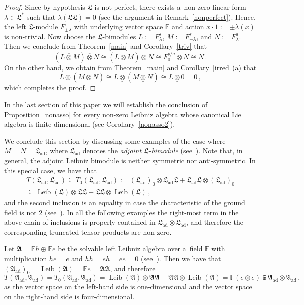 \documentclass{jonasart}
\DeclareMathOperator{\ad}{ad}
\DeclareMathOperator{\leib}{Leib}
\newcommand{\af}{\mathfrak{A}}
\newcommand{\fbb}{\mathbb{F}}
\newcommand{\lf}{\mathfrak{L}}
\newcommand{\ovo}{\overline{\otimes}}
\newcommand{\und}{\underline{\otimes}}
\begin{document}
	\begin{proof}
		Since by hypothesis $\lf$ is not perfect, there exists a~non-zero linear form $\lambda\in\lf^*$ such that $\lambda(\lf\lf)=0$
		(see the argument in Remark~\ref{nonperfect}). Hence, the left
		$\lf$-module $F_{\pm \lambda}$ with underlying vector space
		$\fbb$ and action $x\cdot 1:=\pm\lambda(x)$ is non-trivial. Now choose the $\lf$-bimodules $L:=F_\lambda^s$, $M:=
		F_{-\lambda}^s$, and $N:=F_\lambda^a$. Then we conclude from Theorem~\ref{main} and Corollary~\ref{triv} that
		\[
			(L\ovo M)\ovo N\cong(L\und M)\und N\cong F_0^{s/a}
			\otimes N\cong N\,.
		\]
		On the other hand, we obtain from Theorem~\ref{main} and
		Corollary~\ref{irred}\,(a)
		that
		\[
			L\ovo(M\ovo N)\cong L\und(M\und N)\cong L\und 0=0\,,
		\]
		which completes the proof.
	\end{proof}

	In the last section of this paper we will establish the conclusion of Proposition~\ref{nonasso} for every non-zero Leibniz algebra whose canonical Lie algebra is finite dimensional (see
	Corollary~\ref{nonasso2}).

	We conclude this section by discussing some examples of the case where $M=N=\lf_{\ad}$, where $\lf_{\ad}$ denotes the
	\emph{adjoint $\lf$-bimodule\/} (see~\cite[Example 3.8]{F1}). Note that, in general, the adjoint Leibniz bimodule is neither symmetric nor anti-sym\-metric. In this special case, we have that
	\begin{eqnarray*}
		T(\lf_{\ad},\lf_{\ad})\subseteq T_0 (\lf_{\ad},\lf_{\ad}):=
		(\lf_{\ad})_0\otimes\lf_{\ad}\lf+\lf_{\ad}\lf\otimes(\lf_{\ad})_0\\
		\subseteq\leib(\lf)\otimes\lf\lf+\lf\lf\otimes\leib(\lf)\,,
	\end{eqnarray*}
	and the second inclusion is an equality in case the characteristic of the ground field is not 2 (see~\cite[Example 3.11]{F1}). In all the following examples the right-most term in the above chain of inclusions is properly contained in $\lf_{\ad}\otimes\lf_{\ad}$, and therefore the corresponding truncated tensor products are non-zero.
	\begin{example}
		{Let $\af=\fbb h\oplus\fbb e$ be the solvable left Leibniz algebra over a~field $\fbb$ with multiplication $he=e$ and $hh=
		eh=ee=0$ (see~\cite[Example 2.3]{F1}). Then we have that
		$(\af_{\ad})_0 =\leib(\af)=\fbb e=\af\af$, and therefore}
		\[
			T(\af_{\ad},\af_{\ad})=T_0 (\af_{\ad},\af_{\ad})=\leib(\af)\otimes
			\af\af+\af\af\otimes\leib(\af)=\fbb(e\otimes e)\subsetneqq
			\af_{\ad}\otimes\af_{\ad}\,,
		\]
		{as the vector space on the left-hand side is one-dimensional and the vector space on the right-hand side is four-dimensional.}
	\end{example}
\end{document}
